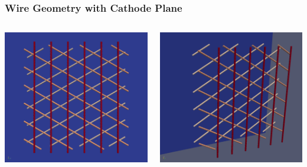 \documentclass[xcolor=dvipsnames]{beamer}
\begin{document}
\begin{frame}
  \frametitle{Wire Geometry with Cathode Plane}
  \begin{columns}
    \begin{column}{0.5\textwidth}
      \begin{center}
        \includegraphics[width=\textwidth]{wires-flat.png}
      \end{center}
    \end{column}
    \begin{column}{0.5\textwidth}
      \begin{center}
        \includegraphics[width=\textwidth]{wires-iso.png}
      \end{center}
    \end{column}
  \end{columns}
  
\end{frame}
\end{document}
